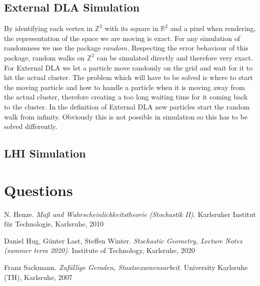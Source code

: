 \documentclass[12pt,a4paper]{scrartcl}
\numberwithin{equation}{subsection}
\newcommand{\R}{\mathbb{R}} %
\newcommand{\Z}{\mathbb{Z}} %
\newcommand{\1}{\mathbbm{1}}
\numberwithin{equation}{section}
\theoremstyle{definition}
\begin{document}
\subsection{External DLA Simulation}

By identifying each vertex in $\Z^2$ with its square in $\R^2$ and a pixel when rendering, the representation of the space we are moving is exact. For any simulation of randomness we use the package $\mathit{random}$. Respecting the error behaviour of this package, random walks on $\Z^2$ can be simulated directly and therefore very exact. For External DLA we let a particle move randomly on the grid and wait for it to hit the actual cluster. The problem which will have to be solved is where to start the moving particle and how to handle a particle when it is moving away from the actual cluster, therefore creating a too long waiting time for it coming back to the cluster. In the definition of External DLA new particles start the random walk from infinity. Obviously this is not possible in simulation so this has to be solved differently. 



\subsection{LHI Simulation}



\newpage
\section{Questions}

\newpage

\begin{thebibliography}{biblio}
\thispagestyle{empty}

N. Henze.
\emph{Maß und Wahrscheinlichkeitstheorie (Stochastik II)}.
Karlsruher Institut für Technologie, Karlsruhe, 2010

Daniel Hug, Günter Last, Steffen Winter.
\emph{Stochastic Geometry, 	Lecture Notes (summer term 2020)}.
Institute of Technology, Karlsruhe, 2020

Franz Sackmann. 
\emph{Zufällige Geraden, Staatsexamensarbeit}.
University Karlsruhe (TH), Karlsruhe, 2007



\end{thebibliography}

\newpage
  
\end{document}
